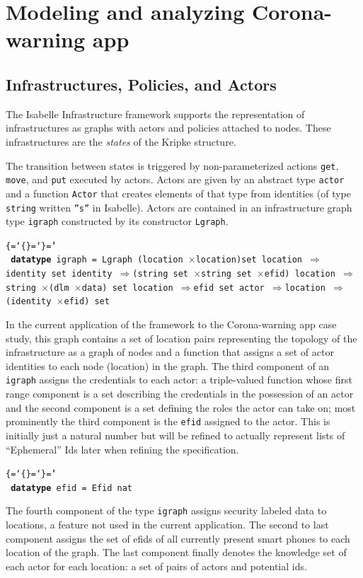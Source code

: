 \documentclass{llncs}
\newenvironment{ttbox}{\begin{alltt}\ttbraces\small\tt}%
                      {\end{alltt}}
\def\ttbraces{\let\.=\nobreak\chardef\{=`\{\chardef\}=`\}\chardef\|=`\\}
\newcommand\ttfun{\mbox{{$\Rightarrow$}}}
\newcommand\ttlam{\mbox{\( \lambda \)}}
\newcommand\tttimes{\mbox{\( \times \)}}
\begin{document}
\section{Modeling and analyzing Corona-warning app}
\label{sec:model}
\subsection{Infrastructures, Policies, and Actors}
\label{sec:infra}
The Isabelle Infrastructure framework supports the representation of infrastructures 
as graphs with actors and policies attached to nodes. These infrastructures 
are the {\it states} of the Kripke structure. %

The transition between states is triggered by non-parameterized
actions \texttt{get}, \texttt{move}, and \texttt{put} 
executed by actors. 
Actors are given by an abstract type \texttt{actor} and a function 
\texttt{Actor} that creates elements of that type from identities 
(of type \texttt{string} written \texttt{''s''} in Isabelle). 
Actors are contained in an infrastructure graph type \texttt{igraph}
constructed by its constructor \texttt{Lgraph}. 
\begin{ttbox}
{\bf datatype} igraph = 
         Lgraph (location \tttimes location)set 
                 location \ttfun identity set
                 identity \ttfun (string set \tttimes string set \tttimes efid)  
                 location \ttfun string \tttimes (dlm \tttimes data) set
                 location \ttfun efid set
                 actor \ttfun location \ttfun (identity \tttimes efid) set
\end{ttbox}
In the current application of the framework to the Corona-warning app case study, 
this graph contains a set of location pairs representing the %
topology of the infrastructure
as a graph of nodes and a function%
that assigns a set of actor identities to each node (location) in the graph.
The third component of an \texttt{igraph} assigns the credentials to each actor: 
a triple-valued function whose first range component is a set describing the credentials 
in the possession of an actor and the second component 
is a set defining the roles the actor can take on; 
most prominently the third component is the \texttt{efid} assigned to the actor. This is initially
just a natural number but will be refined to actually represent lists of ``Ephemeral'' Ids later
when refining the specification.
\begin{ttbox}
{\bf datatype} efid = Efid nat
\end{ttbox}
The fourth component of the type \texttt{igraph}
assigns security labeled data to locations, a feature not used in the
current application.
The second to last component assigns the set of efids of all currently present smart phones
to each location of the graph. The last component finally denotes the knowledge set of each
actor for each location: a set of pairs of actors and potential ids.
\end{document}
